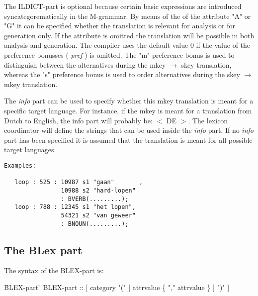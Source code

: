 The ILDICT-part is optional because certain basic expressions are introduced
syncategorematically in the M-grammar. By means of the of the attribute "A" or
"G" it can be specified whether the translation is relevant for analysis or
for generation only. If the attribute is omitted the translation will be 
possible in both analysis and generation. The compiler uses the default value 
0 if the value of the preference bonusses ( {\em pref } ) is omitted. The "m"
preference bonus is used to distinguish between the alternatives during the
mkey $\rightarrow$ skey translation, whereas the "s" preference bonus is used 
to order alternatives during the skey $\rightarrow$ mkey translation.

The {\em info} part can be used to specify whether this mkey translation is meant for 
a specific target language. For instance, if the mkey is meant for a 
translation from Dutch to English, the info part will probably be:
$<$ DE $>$. The lexicon coordinator will define the strings that can be
used inside the {\em info } part. If no {\em info} part has been specified 
it is assumed that the translation is meant for all possible target languages.

\begin{verbatim}
Examples:

   loop : 525 : 10987 s1 "gaan"       ,
                10988 s2 "hard-lopen" 
                : BVERB(.........);
   loop : 788 : 12345 s1 "het lopen",
                54321 s2 "van geweer"
                : BNOUN(.........);
\end{verbatim}            
                                

\subsection {The BLex part}

The syntax of the BLEX-part is:

\begin {tabbing}
   \= BLEX-part \= \kill
   \> BLEX-part \> :: [ category "(" [ attrvalue \{ "," attrvalue \} ] ")" ] \\
\end {tabbing}

